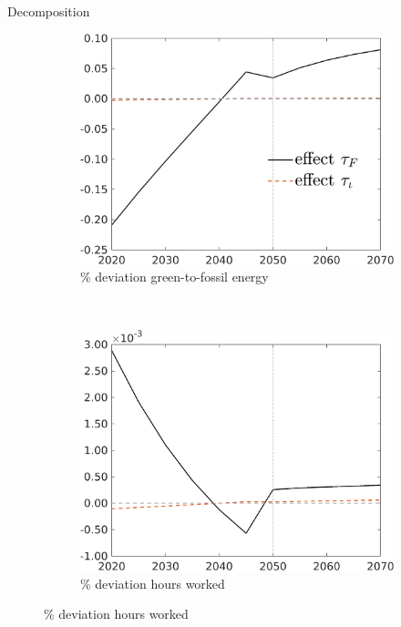 \documentclass[11pt,aspectratio=169]{beamer}
\begin{document}
\begin{frame}{Decomposition}
\hypertarget{decomp}{}
\centering

\begin{figure}[h!!]
	\centering
	\begin{subfigure}{0.4\textwidth}		
		\caption{{\% deviation  green-to-fossil energy }}
		\includegraphics[width=1\textwidth]{../codding_model/own_basedOnFried/optimalPol_010922_revision/figures/all_13Sept22_Tplus30/CountTAUF_Both_Opt_target_GFF_nsk0_xgr0_knspil0_regime4_spillover0_sep0_extern0_PV1_etaa0.79_lgd1.png}
	\end{subfigure}
	\begin{minipage}[]{0.1\textwidth}
		\
	\end{minipage}
	\begin{subfigure}{0.4\textwidth}		
		\caption{{\% deviation hours worked}}
		\includegraphics[width=1\textwidth]{../codding_model/own_basedOnFried/optimalPol_010922_revision/figures/all_13Sept22_Tplus30/CountTAUF_Both_Opt_target_S_nsk0_xgr0_knspil0_regime4_spillover0_sep0_extern0_PV1_etaa0.79_lgd0.png}

\end{subfigure}
\end{figure}
\end{frame}
\end{document}
